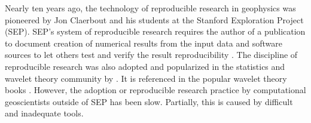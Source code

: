 Nearly ten years ago, the technology of reproducible research in geophysics was
pioneered by Jon Claerbout and his students at the Stanford Exploration
Project (SEP).  SEP's system of reproducible research requires the author of a
publication to document creation of numerical results from the input data and
software sources to let others test and verify the result reproducibility
\cite[]{SEG-1992-0601,matt}. 
The discipline of reproducible research was also adopted and popularized in
the statistics and wavelet theory community by \cite{donoho}. It is referenced
in the popular wavelet theory books \cite[]{hubbard,mallat}. 
However, the adoption or reproducible research practice by computational
geoscientists outside of SEP has been slow.  Partially, this is caused by
difficult and inadequate tools.



